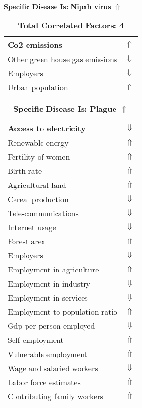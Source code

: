 \documentclass[12pt,notitlepage,oneside]{report}
\begin{document}
\begin{table}[!htb]
\caption{\textbf{Specific Disease Is: Nipah virus $\Uparrow$}}
\centering
\label{Correlated Socio-economic Factors0}
\begin{tabular}{|l|l|}
\hline
Co2 emissions & $\Uparrow$\\ \hline
Other green house gas emissions & $\Downarrow$\\ \hline
Employers & $\Downarrow$\\ \hline
Urban population & $\Uparrow$\\ \hline
\end{tabular}
\caption*{\textbf{Total Correlated Factors: 4}}
\end{table}
\begin{table}[!htb]
\caption{\textbf{Specific Disease Is: Plague $\Uparrow$}}
\centering
\label{Correlated Socio-economic Factors0}
\begin{tabular}{|l|l|}
\hline
Access to electricity & $\Downarrow$\\ \hline
Renewable energy & $\Uparrow$\\ \hline
Fertility of women & $\Uparrow$\\ \hline
Birth rate & $\Uparrow$\\ \hline
Agricultural land & $\Uparrow$\\ \hline
Cereal production & $\Downarrow$\\ \hline
Tele-communications & $\Downarrow$\\ \hline
Internet usage & $\Downarrow$\\ \hline
Forest area & $\Uparrow$\\ \hline
Employers & $\Downarrow$\\ \hline
Employment in agriculture & $\Uparrow$\\ \hline
Employment in industry & $\Downarrow$\\ \hline
Employment in services & $\Downarrow$\\ \hline
Employment to population ratio & $\Uparrow$\\ \hline
Gdp per person employed & $\Downarrow$\\ \hline
Self employment & $\Uparrow$\\ \hline
Vulnerable employment & $\Uparrow$\\ \hline
Wage and salaried workers & $\Downarrow$\\ \hline
Labor force estimates & $\Uparrow$\\ \hline
Contributing family workers & $\Uparrow$\\ \hline

\end{tabular}
\end{table}
\end{document}
